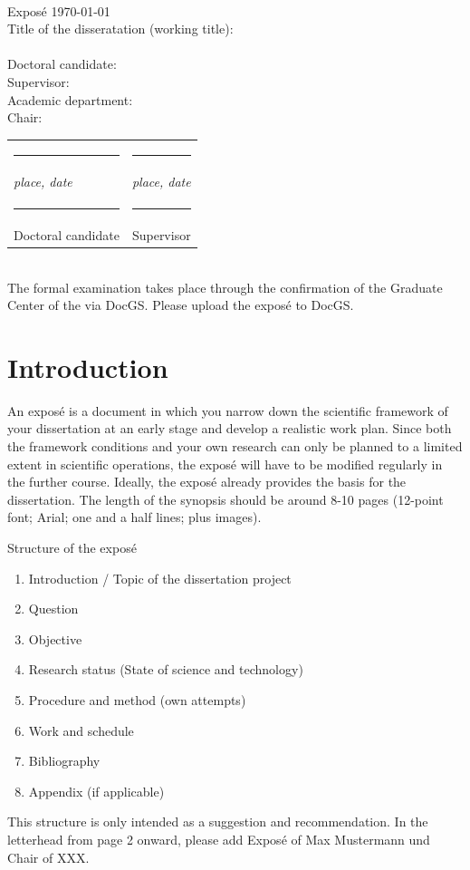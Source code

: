 \documentclass[a4paper, 12pt]{scrartcl}
\begin{document}
\,\\[1cm]
\begin{large}
Exposé \hfill \today\\[0.5cm]
Title of the disseratation (working title):\\[0.2cm]
\Title\\[2cm]
Doctoral candidate: \Student\\[0.5cm]
Supervisor: \Supervisor\\[0.5cm]
Academic department: \School\\[0.5cm]
Chair: \Chair\\[5cm]
\end{large}
\begin{tabularx}{\textwidth}{X X}
\rule{6cm}{0.5pt} & \rule{6cm}{0.5pt}\\
\textit{place, date} & \textit{place, date}\\[2cm]
\rule{6cm}{0.5pt} & \rule{6cm}{0.5pt}\\
Doctoral candidate & Supervisor
\end{tabularx}\\[1cm]
\textcolor{TUMalpha}{The formal examination takes place through the confirmation of the Graduate Center of the \School via DocGS. Please upload the exposé to DocGS.}
\newpage
\section{Introduction}
An exposé is a document in which you narrow down the scientific framework of your dissertation at an early stage and develop a realistic work plan. Since both the framework conditions and your own research can only be planned to a limited extent in scientific operations, the exposé will have to be modified regularly in the further course. Ideally, the exposé already provides the basis for the dissertation.
The length of the synopsis should be around 8-10 pages (12-point font; Arial; one and a half lines; plus images).

Structure of the exposé

\begin{enumerate}
    \item Introduction / Topic of the dissertation project
    \item Question
    \item Objective
    \item Research status (State of science and technology)
    \item Procedure and method (own attempts)
    \item Work and schedule
    \item Bibliography
    \item Appendix (if applicable)
\end{enumerate}
This structure is only intended as a suggestion and recommendation. 
In the letterhead from page 2 onward, please add Exposé of Max Mustermann und Chair of XXX.
\end{document}
